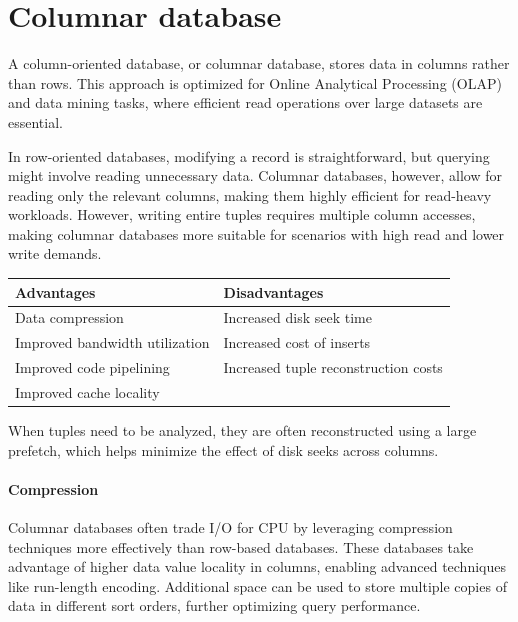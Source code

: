 \section{Columnar database}

A column-oriented database, or columnar database, stores data in columns rather than rows. 
This approach is optimized for Online Analytical Processing (OLAP) and data mining tasks, where efficient read operations over large datasets are essential.

In row-oriented databases, modifying a record is straightforward, but querying might involve reading unnecessary data. 
Columnar databases, however, allow for reading only the relevant columns, making them highly efficient for read-heavy workloads. 
However, writing entire tuples requires multiple column accesses, making columnar databases more suitable for scenarios with high read and lower write demands.
\begin{table}[H]
    \centering
    \begin{tabular}{|l|l|}
    \hline
    \textbf{Advantages}                 & \textbf{Disadvantages}                   \\ \hline
    Data compression                    & Increased disk seek time                 \\ \hline
    Improved bandwidth utilization      & Increased cost of inserts                \\ \hline
    Improved code pipelining            & Increased tuple reconstruction costs     \\ \hline
    Improved cache locality             &                                          \\ \hline
    \end{tabular}
\end{table}
When tuples need to be analyzed, they are often reconstructed using a large prefetch, which helps minimize the effect of disk seeks across columns.

\paragraph*{Compression}
Columnar databases often trade I/O for CPU by leveraging compression techniques more effectively than row-based databases. 
These databases take advantage of higher data value locality in columns, enabling advanced techniques like run-length encoding.
Additional space can be used to store multiple copies of data in different sort orders, further optimizing query performance.

